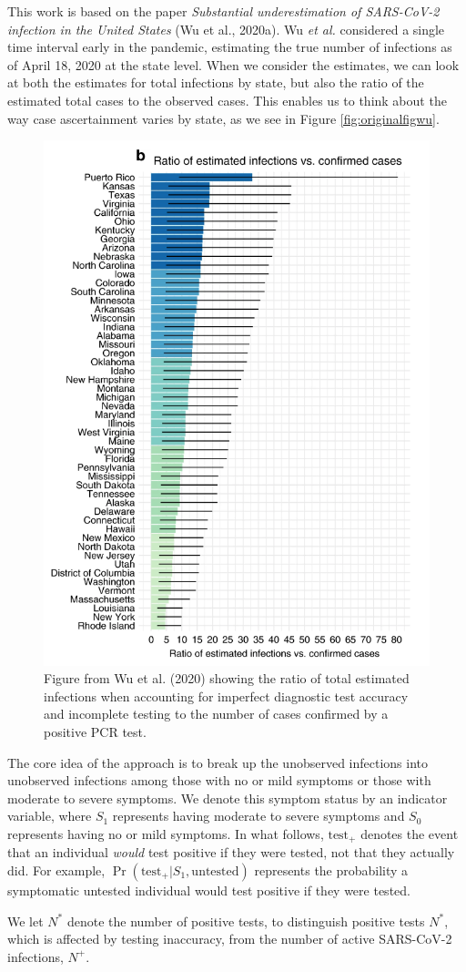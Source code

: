 \documentclass[12pt,twoside]{smiththesis}
\begin{document}
This work is based on the paper \emph{Substantial underestimation of SARS-CoV-2 infection in the United States} (Wu et al., 2020a). Wu \emph{et al.} considered a single time interval early in the pandemic, estimating the true number of infections as of April 18, 2020 at the state level. When we consider the estimates, we can look at both the estimates for total infections by state, but also the ratio of the estimated total cases to the observed cases. This enables us to think about the way case ascertainment varies by state, as we see in Figure
\ref{fig:originalfigwu}.
\begin{figure}
\includegraphics[width=0.5\linewidth]{./figure/figure_original_case_ratio} \caption{\label{fig:originalfigwu}Figure from Wu et al. (2020) showing the ratio of total estimated infections when accounting for imperfect diagnostic test accuracy and incomplete testing to the number of cases confirmed by a positive PCR test.}\label{fig:unnamed-chunk-7}
\end{figure}
The core idea of the approach is to break up the unobserved infections into unobserved infections among those with no or mild symptoms or those with moderate to severe symptoms. We denote this symptom status by an indicator variable, where \(S_1\) represents having moderate to severe symptoms and \(S_0\) represents having no or mild symptoms. In what follows, \(\text{test}_+\) denotes the event that an individual \emph{would} test positive if they were tested, not that they actually did. For example, \(\Pr(\text{test}_+|S_1,\text{untested})\) represents the probability a symptomatic untested individual would test positive if they were tested.

We let \(N^*\) denote the number of positive tests, to distinguish positive tests \(N^*\), which is affected by testing inaccuracy, from the number of active SARS-CoV-2 infections, \(N^+\).
\end{document}
